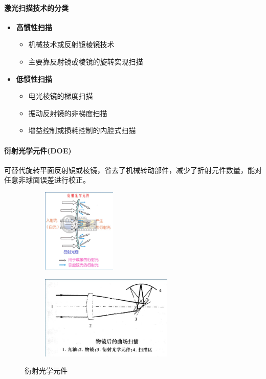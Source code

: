 \paragraph{激光扫描技术的分类}
\begin{itemize}
	\item \textbf{高惯性扫描}
		\begin{itemize}
			\item 机械技术或反射镜棱镜技术
			\item 主要靠反射镜或棱镜的旋转实现扫描
		\end{itemize} %
	\item \textbf{低惯性扫描}
		\begin{itemize}
			\item 电光棱镜的梯度扫描
			\item 振动反射镜的非梯度扫描
			\item 增益控制或损耗控制的内腔式扫描
		\end{itemize}
\end{itemize} %

\paragraph{衍射光学元件(DOE)}可替代旋转平面反射镜或棱镜，省去了机械转动部件，减少了折射元件数量，能对任意非球面误差进行校正。
\begin{figure}
	\centering
	\begin{subfigure}[t]{0.4\linewidth}
		\centering
		\includegraphics[height=4cm]{figure/Chapter2/衍射光学元件的衍射}
	\end{subfigure}
	\begin{subfigure}[t]{0.4\linewidth}
		\centering
		\includegraphics[height=4cm]{figure/Chapter2/DOE物镜后的区场扫描示意图}
	\end{subfigure}
	\caption{衍射光学元件}
	\label{fig:衍射光学元件}
\end{figure}


